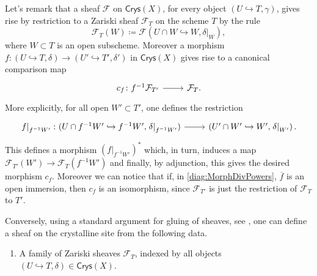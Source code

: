 \begin{rem}\label{rem:SheavesCrysX}
	Let's remark that a sheaf $\mathcal{F}$ on $\mathsf{Crys}(X)$, for every
	object $\left(U \hookrightarrow T, \gamma\right)$, gives rise by restriction
	to a Zariski sheaf $\mathcal{F}_T$ on the scheme $T$ by the rule
	\begin{equation*}
	\mathcal{F}_T(W) \coloneqq
	\mathcal{F}(U \cap W \hookrightarrow W, \left.\delta\right|_{W})
	,\end{equation*}
	where $W \subset T$ is an open subscheme.
	Moreover a morphism 
	$f\colon \left(U \hookrightarrow T, \delta\right) \to
	\left(U' \hookrightarrow T', \delta'\right)$
	in $\mathsf{Crys}(X)$
	gives rise to a canonical comparison map
	\begin{equation*}
	\begin{tikzcd}[row sep = 0ex
		,/tikz/column 1/.append style={anchor=base east}
		,/tikz/column 2/.append style={anchor=base west}]
		c_f\colon f^{-1}\mathcal{F}_{T'} \arrow[r, "", rightarrow] &
		\mathcal{F}_T
	.\end{tikzcd}
	\end{equation*} 
	More explicitly, for all open $W' \subset T'$, one defines the restriction
	\begin{equation*}
	\begin{tikzcd}[row sep = 0ex
		,/tikz/column 1/.append style={anchor=base east}
		,/tikz/column 2/.append style={anchor=base west}]
		\left.f\right|_{f^{-1}W'}\colon 
		(U \cap f^{-1}W' \hookrightarrow f^{-1}W', \left.\delta\right|_{f^{-1}W'} )
		\arrow[r, "", rightarrow] &
		\left(U' \cap W' \hookrightarrow W', \left.\delta\right|_{W'} \right)
	.\end{tikzcd}
	\end{equation*} 
	This defines a morphism $(\left.f\right|_{f^{-1}W'})^*$
	which, in turn, induces a map $\mathcal{F}_{T'}(W') \to \mathcal{F}_T(f^{-1}W')$
	and finally, by adjunction, this gives the desired morphism $c_f$.
	Moreover we can notice that if, in \cref{diag:MorphDivPowers},
	$\overline{f}$ is an open immersion, then
	$c_f$ is an isomorphism, since $\mathcal{F}_{T'}$ is just the restriction
	of $\mathcal{F}_T$ to $T'$.

	Conversely, using a standard argument for gluing of sheaves, see 
	\cite[\href{https://stacks.math.columbia.edu/tag/07IN}{Section 07IN}]{SP},
	one can define a sheaf on the crystalline site from the following data.
	\begin{enumerate}
		\item A family of Zariski sheaves $\mathcal{F}_T$, indexed by 
			all objects $\left(U \hookrightarrow T, \delta\right) \in \mathsf{Crys}(X)$.


\end{enumerate}
\end{rem}
